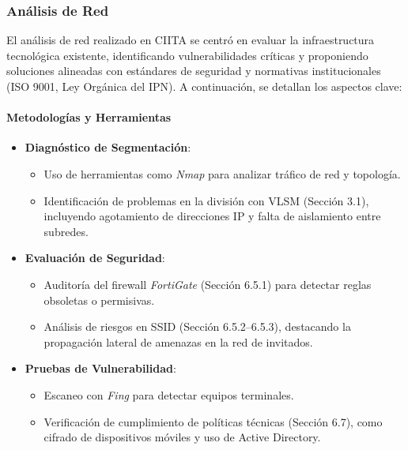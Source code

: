 \subsubsection{Análisis de Red}
El análisis de red realizado en CIITA se centró en evaluar la infraestructura tecnológica existente, identificando vulnerabilidades críticas y proponiendo soluciones alineadas con estándares de seguridad y normativas institucionales (ISO 9001, Ley Orgánica del IPN). A continuación, se detallan los aspectos clave:

\paragraph{Metodologías y Herramientas}
\begin{itemize}
	\item \textbf{Diagnóstico de Segmentación}: 
	\begin{itemize}
		\item Uso de herramientas como \textit{Nmap} para analizar tráfico de red y topología.
		\item Identificación de problemas en la división con VLSM (Sección 3.1), incluyendo agotamiento de direcciones IP y falta de aislamiento entre subredes.
	\end{itemize}
	
	\item \textbf{Evaluación de Seguridad}:
	\begin{itemize}
		\item Auditoría del firewall \textit{FortiGate} (Sección 6.5.1) para detectar reglas obsoletas o permisivas.
		\item Análisis de riesgos en SSID (Sección 6.5.2–6.5.3), destacando la propagación lateral de amenazas en la red de invitados.
	\end{itemize}
	
	\item \textbf{Pruebas de Vulnerabilidad}:
	\begin{itemize}
		\item Escaneo con \textit{Fing} para detectar equipos terminales.
		\item Verificación de cumplimiento de políticas técnicas (Sección 6.7), como cifrado de dispositivos móviles y uso de Active Directory.
	\end{itemize}
\end{itemize}


